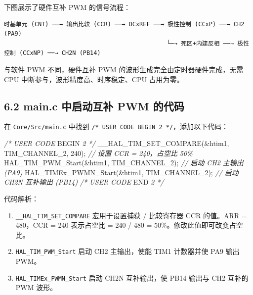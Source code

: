 \documentclass[
  chinese,
  UTF8,
  oneside,
  openany]{ctexbook}
\newenvironment{Shaded}{}{}
\newcommand{\CommentTok}[1]{\textcolor[rgb]{0.38,0.63,0.69}{\textit{#1}}}
\newcommand{\DecValTok}[1]{\textcolor[rgb]{0.25,0.63,0.44}{#1}}
\newcommand{\NormalTok}[1]{#1}
\newcommand{\OperatorTok}[1]{\textcolor[rgb]{0.40,0.40,0.40}{#1}}
\newcommand{\RegionMarkerTok}[1]{#1}
\providecommand{\tightlist}{%
  \setlength{\itemsep}{0pt}\setlength{\parskip}{0pt}}
\begin{document}
下图展示了硬件互补 PWM 的信号流程：

\begin{verbatim}
时基单元 (CNT) ──→ 输出比较 (CCR) ──→ OCxREF ──→ 极性控制 (CCxP) ──→ CH2 (PA9)
                                              └─→ 死区+内建反相 ──→ 极性控制 (CCxNP) ──→ CH2N (PB14)
\end{verbatim}

与软件 PWM 不同，硬件互补 PWM 的波形生成完全由定时器硬件完成，无需 CPU
中断参与，波形精度高、时序稳定、CPU 占用为零。

\subsection{6.2 main.c 中启动互补 PWM
的代码}\label{main.c-ux4e2dux542fux52a8ux4e92ux8865-pwm-ux7684ux4ee3ux7801}

在 \texttt{Core/Src/main.c} 中找到
\texttt{/*\ USER\ CODE\ BEGIN\ 2\ */}，添加以下代码：

\begin{Shaded}
\begin{Highlighting}[]
\CommentTok{/* USER CODE }\RegionMarkerTok{BEGIN}\CommentTok{ 2 */}
\NormalTok{\_\_HAL\_TIM\_SET\_COMPARE}\OperatorTok{(\&}\NormalTok{htim1}\OperatorTok{,}\NormalTok{ TIM\_CHANNEL\_2}\OperatorTok{,} \DecValTok{240}\OperatorTok{);}  \CommentTok{// 设置 CCR = 240，占空比 50\%}
\NormalTok{HAL\_TIM\_PWM\_Start}\OperatorTok{(\&}\NormalTok{htim1}\OperatorTok{,}\NormalTok{ TIM\_CHANNEL\_2}\OperatorTok{);}           \CommentTok{// 启动 CH2 主输出 (PA9)}
\NormalTok{HAL\_TIMEx\_PWMN\_Start}\OperatorTok{(\&}\NormalTok{htim1}\OperatorTok{,}\NormalTok{ TIM\_CHANNEL\_2}\OperatorTok{);}        \CommentTok{// 启动 CH2N 互补输出 (PB14)}
\CommentTok{/* USER CODE }\RegionMarkerTok{END}\CommentTok{ 2 */}
\end{Highlighting}
\end{Shaded}

代码解析：

\begin{enumerate}
\def\labelenumi{\arabic{enumi}.}
\tightlist
\item
  \texttt{\_\_HAL\_TIM\_SET\_COMPARE} 宏用于设置捕获 / 比较寄存器 CCR
  的值。ARR = 480，CCR = 240 表示占空比 = 240 / 480 =
  50\%。修改此值即可改变占空比。
\item
  \texttt{HAL\_TIM\_PWM\_Start} 启动 CH2 主输出，使能 TIM1 计数器并使
  PA9 输出 PWM。
\item
  \texttt{HAL\_TIMEx\_PWMN\_Start} 启动 CH2N 互补输出，使 PB14 输出与
  CH2 互补的 PWM 波形。
\end{enumerate}
\end{document}
